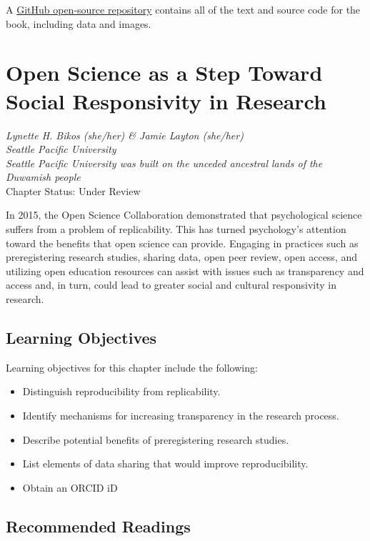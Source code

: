 \documentclass[
  11pt,
]{book}
\providecommand{\tightlist}{%
  \setlength{\itemsep}{0pt}\setlength{\parskip}{0pt}}
\begin{document}
A \href{https://github.com/lhbikos/ReC_MultivModel}{GitHub open-source repository} contains all of the text and source code for the book, including data and images.

\hypertarget{OpSci}{%
\chapter{Open Science as a Step Toward Social Responsivity in Research}\label{OpSci}}

\emph{Lynette H. Bikos (she/her) \& Jamie Layton (she/her)}\\
\emph{Seattle Pacific University}\\
\emph{Seattle Pacific University was built on the unceded ancestral lands of the Duwamish people}\\
Chapter Status: Under Review

In 2015, the Open Science Collaboration demonstrated that psychological science suffers from a problem of replicability. This has turned psychology's attention toward the benefits that open science can provide. Engaging in practices such as preregistering research studies, sharing data, open peer review, open access, and utilizing open education resources can assist with issues such as transparency and access and, in turn, could lead to greater social and cultural responsivity in research.

\hypertarget{learning-objectives}{%
\section{Learning Objectives}\label{learning-objectives}}

Learning objectives for this chapter include the following:

\begin{itemize}
\tightlist
\item
  Distinguish reproducibility from replicability.
\item
  Identify mechanisms for increasing transparency in the research process.
\item
  Describe potential benefits of preregistering research studies.
\item
  List elements of data sharing that would improve reproducibility.
\item
  Obtain an ORCID iD
\end{itemize}

\hypertarget{recommended-readings}{%
\section{Recommended Readings}\label{recommended-readings}}
\end{document}
